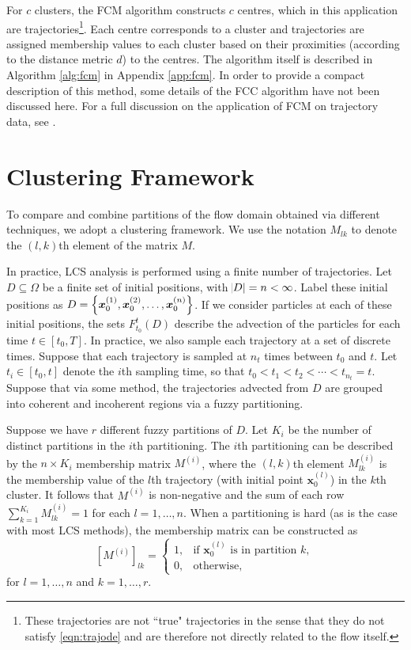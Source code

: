 \documentclass[a4paper, fontsize=12pt]{article}
\begin{document}
For \(c\) clusters, the FCM algorithm constructs \(c\) centres, which in this application are trajectories\footnote{These trajectories are not ``true" trajectories in the sense that they do not satisfy \eqref{eqn:trajode} and are therefore not directly related to the flow itself.}. Each centre corresponds to a cluster and trajectories are assigned membership values to each cluster based on their proximities (according to the distance metric \(d\)) to the centres. The algorithm itself is described in Algorithm \ref{alg:fcm} in Appendix \ref{app:fcm}. In order to provide a compact description of this method, some details of the FCC algorithm have not been discussed here. For a full discussion on the application of FCM on trajectory data, see \cite{froyland_2015_fuzzy}. 


\section{Clustering Framework}
To compare and combine partitions of the flow domain obtained via different techniques, we adopt a clustering framework. We use the notation \(M_{lk}\) to denote the \((l,k)\)th element of the matrix \(M\).

In practice, LCS analysis is performed using a finite number of trajectories. Let \(D \subseteq \Omega\) be a finite set of initial positions, with \(\abs{D} = n < \infty\). Label these initial positions as \(D = \set{\bm{x}_0^{(1)}, \bm{x}_0^{(2)}, \hdots, \bm{x}_0^{(n)}}\). If we consider particles at each of these initial positions, the sets \(F_{t_0}^{t}(D)\) describe the advection of the particles for each time \(t \in [t_0, T]\). In practice, we also sample each trajectory at a set of discrete times. Suppose that each trajectory is sampled at \(n_t\) times between \(t_0\) and \(t\). Let \(t_i \in [t_0,t]\) denote the \(i\)th sampling time, so that \(t_0 < t_1 < t_2 <\cdots < t_{n_t} = t\). Suppose that via some method, the trajectories advected from \(D\) are grouped into coherent and incoherent regions via a fuzzy partitioning. 

Suppose we have \(r\) different fuzzy partitions of \(D\). Let \(K_i\) be the number of distinct partitions in the \(i\)th partitioning. The \(i\)th partitioning can be described by the \(n\times K_i\) membership matrix \(M^{(i)}\), where the \((l,k)\)th element \(M^{(i)}_{lk}\) is the membership value of the \(l\)th trajectory (with initial point \(\bm{x}_0^{(l)}\)) in the \(k\)th cluster. It follows that \(M^{(i)}\) is non-negative and the sum of each row \(\sum_{k=1}^{K_i}{M^{(i)}_{lk}} = 1\) for each \(l = 1,\hdots,n\). When a partitioning is hard (as is the case with most LCS methods), the membership matrix can be constructed as
\[
[M^{(i)}]_{lk} = \begin{cases}
	1, & \text{if } \bm{x}_0^{(l)} \text{ is in partition } k, \\
	0, & \text{otherwise},
\end{cases}
\]
for \(l = 1,\hdots, n\) and \(k = 1,\hdots, r\).
\end{document}
